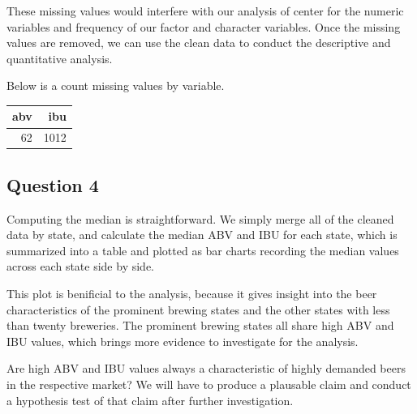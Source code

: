 \documentclass[]{article}
\newenvironment{Shaded}{\begin{snugshade}}{\end{snugshade}}
\newcommand{\KeywordTok}[1]{\textcolor[rgb]{0.13,0.29,0.53}{\textbf{#1}}}
\newcommand{\StringTok}[1]{\textcolor[rgb]{0.31,0.60,0.02}{#1}}
\newcommand{\CommentTok}[1]{\textcolor[rgb]{0.56,0.35,0.01}{\textit{#1}}}
\newcommand{\ControlFlowTok}[1]{\textcolor[rgb]{0.13,0.29,0.53}{\textbf{#1}}}
\newcommand{\OperatorTok}[1]{\textcolor[rgb]{0.81,0.36,0.00}{\textbf{#1}}}
\newcommand{\NormalTok}[1]{#1}
\begin{document}
These missing values would interfere with our analysis of center for the
numeric variables and frequency of our factor and character variables.
Once the missing values are removed, we can use the clean data to
conduct the descriptive and quantitative analysis.

Below is a count missing values by variable.

\begin{Shaded}
\end{Shaded}

\begin{longtable}[]{@{}rr@{}}
\toprule
abv & ibu\tabularnewline
\midrule
\endhead
62 & 1012\tabularnewline
\bottomrule
\end{longtable}

\subsection{Question 4}\label{question-4}

Computing the median is straightforward. We simply merge all of the
cleaned data by state, and calculate the median ABV and IBU for each
state, which is summarized into a table and plotted as bar charts
recording the median values across each state side by side.

This plot is benificial to the analysis, because it gives insight into
the beer characteristics of the prominent brewing states and the other
states with less than twenty breweries. The prominent brewing states all
share high ABV and IBU values, which brings more evidence to investigate
for the analysis.

Are high ABV and IBU values always a characteristic of highly demanded
beers in the respective market? We will have to produce a plausable
claim and conduct a hypothesis test of that claim after further
investigation.
\end{document}
